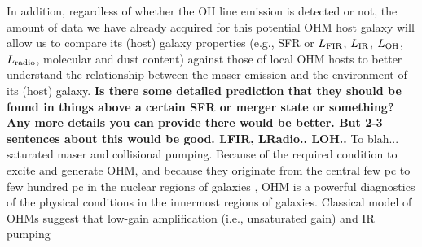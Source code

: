 \documentclass[letterpaper,11pt]{article}
\newcommand{\LIR}{\mbox{$L_{\rm IR}$}\xspace}
\newcommand{\LFIR}{\mbox{$L_{\rm FIR}$}\xspace}
\newcommand{\LOH}{$L_{\rm OH}$\xspace}
\begin{document}
In addition, regardless of whether the OH line emission is detected or not, the amount of data we have already acquired 
for this potential OHM host galaxy will allow us to compare its (host) galaxy properties 
(e.g., SFR or \LFIR, \LIR, \LOH, $L_{\rm radio}$, molecular and dust content)
against those of local OHM hosts to better understand 
the relationship between the maser emission and the environment of its (host) galaxy. 
{\bf  Is there some
detailed prediction that they should be found in things above a
certain SFR or merger state or something? Any more details you can
provide there would be better. But 2-3 sentences about this would be good.
LFIR, LRadio.. LOH.. 
}
To blah... saturated maser and collisional pumping. %
% 
Because of the required condition to excite and generate OHM, and because they originate from the central few pc to few hundred pc 
in the nuclear regions of galaxies \citep{Diamond99a},
OHM is a powerful diagnostics of the physical 
conditions in the innermost regions of galaxies. 
Classical model of OHMs suggest that low-gain amplification (i.e., unsaturated gain) and IR pumping 
\end{document}
